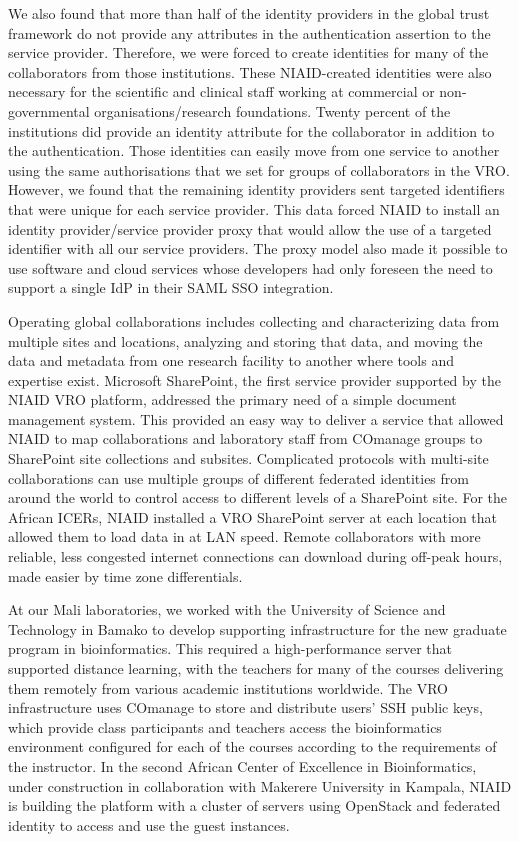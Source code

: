 \documentclass[fleqn,11pt]{wlscirep}
\begin{document}
{We also found that more than half of the identity providers in the global trust framework do not provide any attributes in the authentication assertion to the service provider.  Therefore, we were forced to create identities for many of the collaborators from those institutions.  These NIAID-created identities were also necessary for the scientific and clinical staff working at commercial or non-governmental organisations/research foundations.  Twenty percent of the institutions did provide an identity attribute for the collaborator in addition to the authentication.  Those identities can easily move from one service to another using the same authorisations that we set for groups of collaborators in the VRO.  However, we found that the remaining identity providers sent targeted identifiers that were unique for each service provider.  This data forced NIAID to install an identity provider/service provider proxy that would allow the use of a targeted identifier with all our service providers.  The proxy model also made it possible to use software and cloud services whose developers had only foreseen the need to support a single IdP in their SAML SSO integration.

Operating global collaborations includes collecting and characterizing data from multiple sites and locations, analyzing and storing that data, and moving the data and metadata from one research facility to another where tools and expertise exist.  Microsoft SharePoint, the first service provider supported by the NIAID VRO platform, addressed the primary need of a simple document management system.  This provided an easy way to deliver a service that allowed NIAID to map collaborations and laboratory staff from COmanage groups to SharePoint site collections and subsites.  Complicated protocols with multi-site collaborations can use multiple groups of different federated identities from around the world to control access to different levels of a SharePoint site.  For the African ICERs, NIAID installed a VRO SharePoint server at each location that allowed them to load data in at LAN speed.  Remote collaborators with more reliable, less congested internet connections can download during off-peak hours, made easier by time zone differentials.

At our Mali laboratories, we worked with the University of Science and Technology in Bamako to develop supporting infrastructure for the new graduate program in bioinformatics.  This required a high-performance server that supported distance learning, with the teachers for many of the courses delivering them remotely from various academic institutions worldwide.  The VRO infrastructure uses COmanage to store and distribute users' SSH public keys, which provide class participants and teachers access the bioinformatics environment configured for each of the courses according to the requirements of the instructor.  In the second African Center of Excellence in Bioinformatics, under construction in collaboration with Makerere University in Kampala, NIAID is building the platform with a cluster of servers using OpenStack and federated identity to access and use the guest instances.

}
\end{document}
